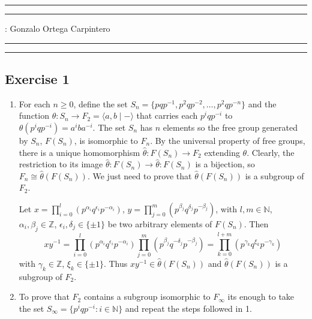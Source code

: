 \documentclass[11pt,a4paper]{article}
\newcommand{\Z}{\mathbb Z}
\newcommand{\N}{\mathbb N}
\begin{document}
\hrule\hrule
\vspace{1mm}


\vspace{1mm}

 : Gonzalo Ortega Carpintero
\vspace{2mm}

\hrule\hrule

\subsection*{Exercise 1}
\begin{enumerate}
  \item For each $ n \geq 0 $, define the set $ S_n = \{p q p^{-1}, p^2 q p^{-2}, \dots, p^2 q p^{-n}\} $ and the function $ \theta \colon S_n \to F_2 = \langle a, b \mid -\rangle $ that carries each $ p^i q p^{-i} $ to $ \theta(p^i q p^{-i}) = a^i b a^{-i} $. The set $ S_n $ has $ n $ elements so the free group generated by $ S_n $, $F(S_n)$, is isomorphic to $ F_n $. By the universal property of free groups, there is a unique homomorphism $ \hat \theta \colon F(S_n) \to F_2 $ extending $ \theta $. Clearly, the restriction to its image $ \hat \theta \colon F(S_n) \to \hat \theta \colon F(S_n) $ is a bijection, so $ F_n \cong \hat \theta(F(S_n)) $. We just need to prove that $ \hat \theta(F(S_n)) $ is a subgroup of $ F_2 $.

  Let $ x = \prod_{i=0}^{l}(p^{\alpha_i} q^{\epsilon_i} p^{-\alpha_i}) $,
  $ y = \prod_{j=0}^{m}(p^{\beta_j} q^{\delta_j} p^{-\beta_j}) $, with $l, m \in \N $, $\alpha_i, \beta_j \in \Z $, $\epsilon_i, \delta_j \in \{ \pm 1\} $ be two arbitrary elements of $ F(S_n) $. Then
  $$
    xy^{-1} = \prod_{i=0}^{l}(p^{\alpha_i} q^{\epsilon_i} p^{-\alpha_i})
    \prod_{j=0}^{m}(p^{\beta_j} q^{-\delta_j} p^{-\beta_j}) = \prod_{k=0}^{l + m} (p^{\gamma_k} q^{\xi_k} p^{-\gamma_k})  
  $$
  with $ \gamma_k \in \Z $, $ \xi_k \in \{ \pm 1\} $. Thus $ xy^{-1} \in \hat \theta(F(S_n)) $ and $ \hat \theta(F(S_n)) $ is a subgroup of $ F_2 $.

  \item To prove that $ F_2 $ contains a subgroup isomorphic to $ F_\infty $ its enough to take the set $ S_\infty = \{p^i q p^{-i} : i \in \N \} $ and repeat the steps followed in 1.
\end{enumerate}
\end{document}
